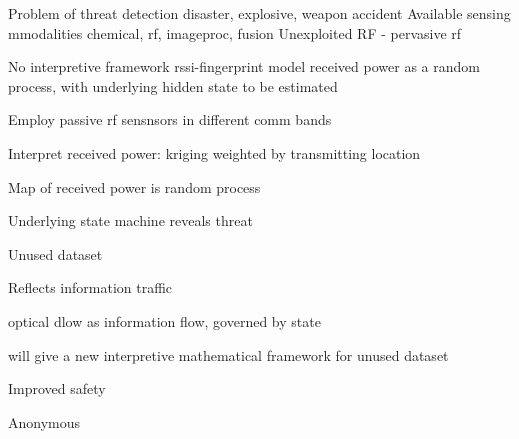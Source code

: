 

Problem of threat detection
disaster, explosive, weapon accident
Available sensing mmodalities
chemical, rf, imageproc, fusion
Unexploited RF - pervasive rf

No interpretive framework
rssi-fingerprint
model received power as a random process, with underlying hidden state to be estimated

Employ passive rf sensnsors in different comm bands

Interpret received power: kriging weighted by transmitting location

Map of received power is random process

Underlying state machine reveals threat
\cite{sigg2014rf}

Unused dataset

Reflects information traffic

optical dlow as information flow, governed by state

will give a new interpretive mathematical framework for unused dataset

Improved safety

Anonymous
